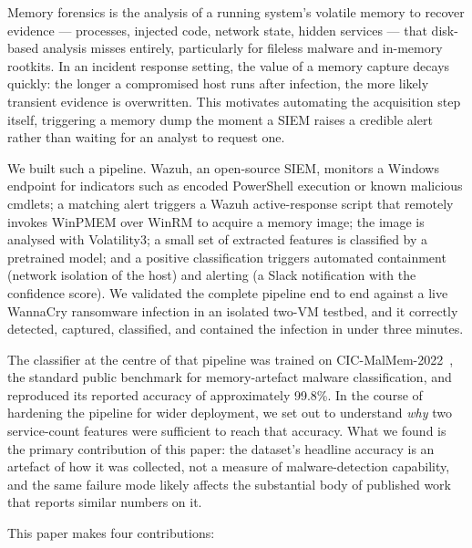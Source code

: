 \documentclass[conference]{IEEEtran}
\begin{document}
Memory forensics is the analysis of a running system's volatile memory to recover
evidence --- processes, injected code, network state, hidden services --- that
disk-based analysis misses entirely, particularly for fileless malware and
in-memory rootkits. In an incident response setting, the value of a memory
capture decays quickly: the longer a compromised host runs after infection, the
more likely transient evidence is overwritten. This motivates automating the
acquisition step itself, triggering a memory dump the moment a SIEM raises a
credible alert rather than waiting for an analyst to request one.

We built such a pipeline. Wazuh, an open-source SIEM, monitors a Windows
endpoint for indicators such as encoded PowerShell execution or known malicious
cmdlets; a matching alert triggers a Wazuh active-response script that
remotely invokes WinPMEM over WinRM to acquire a memory image; the image is
analysed with Volatility3; a small set of extracted features is classified by a
pretrained model; and a positive classification triggers automated containment
(network isolation of the host) and alerting (a Slack notification with the
confidence score). We validated the complete pipeline end to end against a live
WannaCry ransomware infection in an isolated two-VM testbed, and it correctly
detected, captured, classified, and contained the infection in under three
minutes.

The classifier at the centre of that pipeline was trained on
CIC-MalMem-2022~\cite{carrier2022}, the standard public benchmark for
memory-artefact malware classification, and reproduced its reported accuracy of
approximately 99.8\%. In the course of hardening the pipeline for wider
deployment, we set out to understand \emph{why} two service-count features were
sufficient to reach that accuracy. What we found is the primary contribution of
this paper: the dataset's headline accuracy is an artefact of how it was
collected, not a measure of malware-detection capability, and the same failure
mode likely affects the substantial body of published work that reports similar
numbers on it.

This paper makes four contributions:
\end{document}
